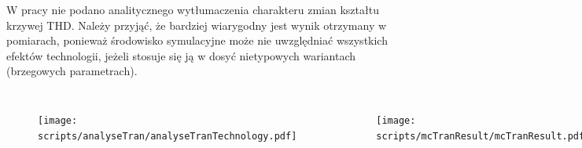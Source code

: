 \begin{frame}[t]
    \vspace{-1em}
    \begin{block}{\tb}
    \end{block}
    W pracy nie podano analitycznego wytłumaczenia charakteru zmian kształtu krzywej THD.
    Należy przyjąć, że bardziej wiarygodny jest wynik otrzymany w pomiarach, ponieważ środowisko symulacyjne może nie uwzględniać wszystkich efektów technologii, jeżeli stosuje się ją w dosyć nietypowych wariantach (brzegowych parametrach).  
    \vspace{-2em}

    \begin{columns}
        \begin{figure}[H]
        \centering
        \texttt{[image: scripts/analyseTran/analyseTranTechnology.pdf]}
        \end{figure}
            

        \begin{figure}[H]
            \centering
        \texttt{[image: scripts/mcTranResult/mcTranResult.pdf]}
        \end{figure}

        \begin{figure}[H]
            \centering
            \texttt{[image: scripts/embc2021THD\_size/embc2021THD\_size\_0\_100.pdf]}
        \end{figure}
    \end{columns}
\end{frame}


